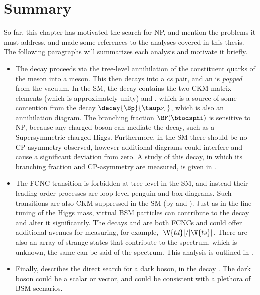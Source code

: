 \section{Summary}

So far, this chapter has motivated the search for NP, and mention the problems it must address,
and made some references to the analyses covered in this thesis.
The following paragraphs will summarizes each analysis and motivate it briefly.
\vspace{8pt}
\begin{flushright}
  \begin{minipage}{0.95\textwidth}
    \begin{itemize}
      \setlength{\itemsep}{8pt}
      \item[\Chap{ch:dsphi}]
        The decay \btodsphi proceeds via the tree-level annihilation of the constituent quarks of the \Bp
        meson into a \Wp meson.
        This then decays into a $c\bar s$ pair, and an \ssbar is \emph{popped} from the vacuum.
        In the SM, the decay contains the two CKM matrix elements  (which is approximately unity) and
        , which is a source of some contention from the decay $\decay{\Bp}{\taup\nu_\tau}$, which
        is also an annihilation diagram.
        The branching fraction $\BF(\btodsphi)$ is sensitive to NP, because any charged boson can mediate
        the decay, such as a Supersymmetric charged Higgs.
        Furthermore, in the SM there should be no CP asymmetry observed, however additional diagrams could
        interfere and cause a significant deviation from zero.
        A study of this decay, in which its branching fraction and CP-asymmetry are measured, is given in
        .
      \item[\Chap{ch:hhh}]
        The FCNC transition  is forbidden at tree level in the SM, and instead their
        leading order processes are loop level penguin and box diagrams.
        Such transitions are also CKM suppressed in the SM (by  and ).
        Just as in the fine tuning of the Higgs mass, virtual BSM particles can contribute to the decay and
        alter it significantly.
        The decays \btokpipimumu and \btophikmumu are both  FCNCs and could offer
        additional avenues for measuring, for example, $|\V{td}|/|\V{ts}|$.
        There are also an array of strange states that contribute to the \kpipi spectrum, which is unknown,
        the same can be said of the \phik spectrum.
        This analysis is outlined in .
      \item[\Chap{ch:db}]
        Finally,  describes the direct search for a dark boson, \decay{\db}{\mumu} in the
        decay \decay{\Bd}{\Kstarent\mumu}.
        The dark boson could be a scalar or vector, and could be consistent with a plethora of BSM
        scenarios.
    \end{itemize}
  \end{minipage}
\end{flushright}








